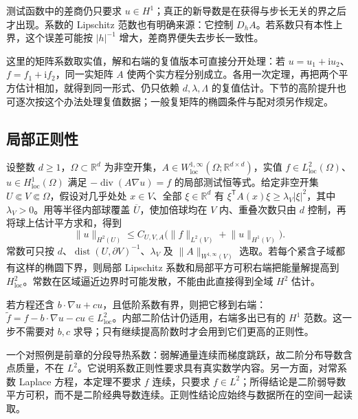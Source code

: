 测试函数中的差商仍只要求 \(u\in H^1\)；真正的新导数是在获得与步长无关的界之后才出现。系数的 Lipschitz 范数也有明确来源：它控制 \(D_hA\)。若系数只有本性上界，这个误差可能按 \(|h|^{-1}\) 增大，差商界便失去步长一致性。

这里的矩阵系数取实值，解和右端的复值版本可直接分开处理：若 \(u=u_1+\mathrm i u_2\)、\(f=f_1+\mathrm i f_2\)，同一实矩阵 \(A\) 使两个实方程分别成立。各用一次定理，再把两个平方估计相加，就得到同一形式、仍只依赖 \(d,\lambda,\Lambda\) 的复值估计。下节的高阶提升也可逐次按这个办法处理复值数据；一般复矩阵的椭圆条件与配对须另作规定。

\subsection{局部正则性}
\label{b2:subsec:160103}

设整数 \(d\geq1\)，\(\Omega\subset\mathbb R^d\) 为非空开集，\(A\in W_{\mathrm{loc}}^{1,\infty}(\Omega;\mathbb R^{d\times d})\)，实值 \(f\in L_{\mathrm{loc}}^2(\Omega)\)、\(u\in H_{\mathrm{loc}}^1(\Omega)\) 满足 \(-\operatorname{div}(A\nabla u)=f\) 的局部测试恒等式。给定非空开集 \(U\Subset V\Subset\Omega\)，假设对几乎处处 \(x\in V\)、全部 \(\xi\in\mathbb R^d\) 有 \(\xi^{\mathsf T}A(x)\xi\geq\lambda_V|\xi|^2\)，其中 \(\lambda_V>0\)。用等半径内部球覆盖 \(\overline U\)，使加倍球均在 \(V\) 内、重叠次数只由 \(d\) 控制，再将球上估计平方求和，得到
\[\lVert u\rVert_{H^2(U)}\le C_{U,V,A}\bigl(\lVert f\rVert_{L^2(V)}+\lVert u\rVert_{H^1(V)}\bigr).\]
常数可只按 \(d\)、\(\operatorname{dist}(U,\partial V)^{-1}\)、\(\lambda_V\) 及 \(\|A\|_{W^{1,\infty}(V)}\) 选取。若每个紧含子域都有这样的椭圆下界，则局部 Lipschitz 系数和局部平方可积右端把能量解提高到 \(H_{\mathrm{loc}}^2\)。常数在区域逼近边界时可能发散，不能由此直接得到全域 \(H^2\) 估计。

\ProseParagraphBreak

若方程还含 \(b\cdot\nabla u+cu\)，且低阶系数有界，则把它移到右端：\(\widetilde f=f-b\cdot\nabla u-cu\in L_{\mathrm{loc}}^2\)。内部二阶估计仍适用，右端多出已有的 \(H^1\) 范数。这一步不需要对 \(b,c\) 求导；只有继续提高阶数时才会用到它们更高的正则性。

\ProseParagraphBreak

一个对照例是前章的分段导热系数：弱解通量连续而梯度跳跃，故二阶分布导数含点质量，不在 \(L^2\)。它说明系数正则性要求具有真实数学内容。另一方面，对常系数 Laplace 方程，本定理不要求 \(f\) 连续，只要求 \(f\in L^2\)；所得结论是二阶弱导数平方可积，而不是二阶经典导数连续。正则性结论应始终与数据所在的空间一起读取。
